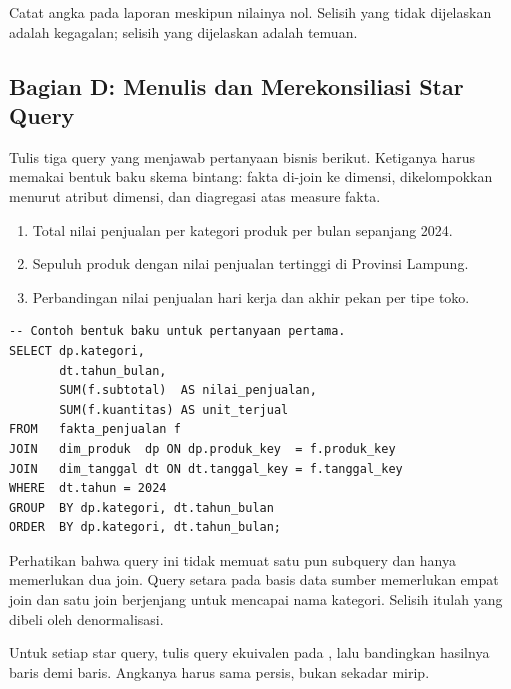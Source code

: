 Catat angka  pada laporan meskipun nilainya nol. Selisih yang
tidak dijelaskan adalah kegagalan; selisih yang dijelaskan adalah temuan.

\subsection{Bagian D: Menulis dan Merekonsiliasi Star Query}


Tulis tiga query yang menjawab pertanyaan bisnis berikut. Ketiganya harus
memakai bentuk baku skema bintang: fakta di-join ke dimensi, dikelompokkan
menurut atribut dimensi, dan diagregasi atas measure fakta.

\begin{enumerate}[leftmargin=1.4em]
  \item Total nilai penjualan per kategori produk per bulan sepanjang 2024.
  \item Sepuluh produk dengan nilai penjualan tertinggi di Provinsi Lampung.
  \item Perbandingan nilai penjualan hari kerja dan akhir pekan per tipe toko.
\end{enumerate}

\begin{lstlisting}[style=sqlgaya]
-- Contoh bentuk baku untuk pertanyaan pertama.
SELECT dp.kategori,
       dt.tahun_bulan,
       SUM(f.subtotal)  AS nilai_penjualan,
       SUM(f.kuantitas) AS unit_terjual
FROM   fakta_penjualan f
JOIN   dim_produk  dp ON dp.produk_key  = f.produk_key
JOIN   dim_tanggal dt ON dt.tanggal_key = f.tanggal_key
WHERE  dt.tahun = 2024
GROUP  BY dp.kategori, dt.tahun_bulan
ORDER  BY dp.kategori, dt.tahun_bulan;
\end{lstlisting}

Perhatikan bahwa query ini tidak memuat satu pun subquery dan hanya
memerlukan dua join. Query setara pada basis data sumber memerlukan empat join
dan satu join berjenjang untuk mencapai nama kategori. Selisih itulah yang
dibeli oleh denormalisasi.


Untuk setiap star query, tulis query ekuivalen pada ,
lalu bandingkan hasilnya baris demi baris. Angkanya harus sama persis, bukan
sekadar mirip.

